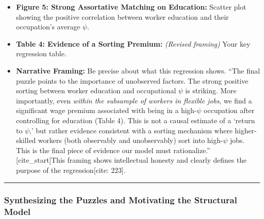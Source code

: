 \documentclass[
  11pt,
  letterpaper,
  DIV=11,
  numbers=noendperiod]{scrartcl}
\providecommand{\tightlist}{%
  \setlength{\itemsep}{0pt}\setlength{\parskip}{0pt}}\usepackage{longtable,booktabs,array}
\begin{document}
\begin{itemize}
  \begin{itemize}
  \tightlist
  \item
    \textbf{Figure 5: Strong Assortative Matching on Education:} Scatter
    plot showing the positive correlation between worker education and
    their occupation's average \(\psi\).
  \item
    \textbf{Table 4: Evidence of a Sorting Premium:} \emph{(Revised
    framing)} Your key regression table.
  \item
    \textbf{Narrative Framing:} Be precise about what this regression
    shows. ``The final puzzle points to the importance of unobserved
    factors. The strong positive sorting between worker education and
    occupational \(\psi\) is striking. More importantly, even
    \emph{within the subsample of workers in flexible jobs}, we find a
    significant wage premium associated with being in a high-\(\psi\)
    occupation after controlling for education (Table 4). This is not a
    causal estimate of a `return to \(\psi\),' but rather evidence
    consistent with a sorting mechanism where higher-skilled workers
    (both observably and unobservably) sort into high-\(\psi\) jobs.
    This is the final piece of evidence our model must rationalize.''
    {[}cite\_start{]}This framing shows intellectual honesty and clearly
    defines the purpose of the regression{[}cite: 223{]}.
  \end{itemize}
\end{itemize}

\begin{center}\rule{0.5\linewidth}{0.5pt}\end{center}

\subsubsection{\texorpdfstring{\textbf{Synthesizing the Puzzles and
Motivating the Structural
Model}}{Synthesizing the Puzzles and Motivating the Structural Model}}\label{synthesizing-the-puzzles-and-motivating-the-structural-model}
\end{document}
